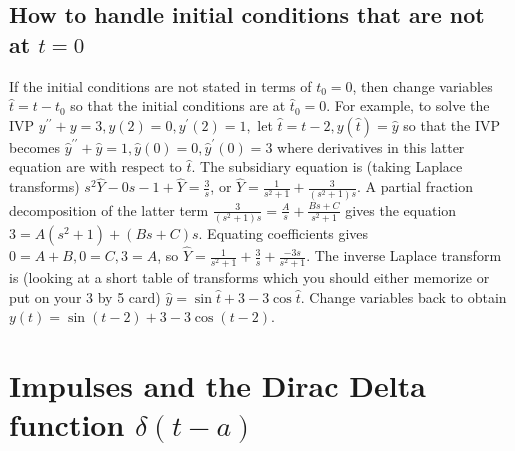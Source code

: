 \subsection{How to handle initial conditions that are not at $t=0$}
If the initial conditions are not stated in terms of $t_0=0$, then change variables $\hat t = t-t_0$ so that the initial conditions are at $\hat t_0 =0$.  For example, to solve the IVP $y^{\prime\prime}+y=3, y(2)=0, y^\prime(2) = 1,$ let $\hat t = t-2,y(\hat t) = \hat y$ so that the IVP becomes $\hat y^{\prime\prime}+\hat y=1, \hat y(0)=0, \hat y^\prime(0) = 3$ where derivatives in this latter equation are with respect to $\hat t$.  The subsidiary equation is (taking Laplace transforms) $s^2\hat Y - 0s -1 +\hat Y=\frac{3}{s}$, or $\hat Y=\frac{1}{s^2+1} + \frac{3}{(s^2+1)s}$.  A partial fraction decomposition of the latter term $\frac{3}{(s^2+1)s} = \frac{A}{s}+\frac{Bs+C}{s^2+1}$ gives the equation $3 = A(s^2+1)+(Bs+C)s$. Equating coefficients gives $0=A+B,0=C,3=A$, so $\hat Y = \frac{1}{s^2+1}+\frac{3}{s}+\frac{-3s}{s^2+1}$.  The inverse Laplace transform is (looking at a short table of transforms which you should either memorize or put on your 3 by 5 card) $\hat y = \sin \hat t +3 - 3\cos \hat t$. Change variables back to obtain $y(t) = \sin(t-2) +3 - 3\cos( t-2)$.




\section{Impulses and the Dirac Delta function $\delta(t-a)$}

